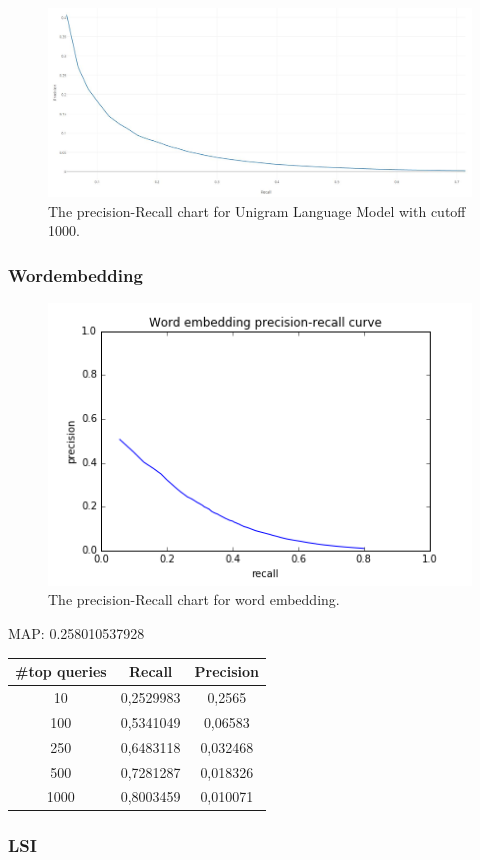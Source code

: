\begin{figure}[H]
	\centering
	\includegraphics[width=130mm]{images/uniresult1000.jpg}
	\caption{The precision-Recall chart for Unigram Language Model with cutoff 1000.}
	\label{fig:uniresult1000}
\end{figure}



\subsubsection{Wordembedding}
\begin{figure}[H]
	\centering
	\includegraphics[width=130mm]{images/precision-recall_embedding.png}
	\caption{The precision-Recall chart for word embedding.}
	\label{fig:embeddingpresicionrecall}
\end{figure}
MAP: 0.258010537928
\begin{table}[H]
	\centering
    \begin{tabular}{| c | c | c |}
        \hline
        \textbf{\#top queries} & \textbf{Recall} & \textbf{Precision}\\ \hline
        10   & 0,2529983  & 0,2565 \\
        100  & 0,5341049  & 0,06583 \\
        250  & 0,6483118  & 0,032468  \\
        500  & 0,7281287  & 0,018326 \\
        1000 & 0,8003459  & 0,010071 \\
        \hline
    \end{tabular}
\end{table}

\subsubsection{LSI}
